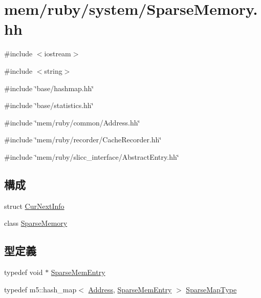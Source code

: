 \hypertarget{SparseMemory_8hh}{
\section{mem/ruby/system/SparseMemory.hh}
\label{SparseMemory_8hh}
}
{\ttfamily \#include $<$iostream$>$}\par
{\ttfamily \#include $<$string$>$}\par
{\ttfamily \#include \char`\"{}base/hashmap.hh\char`\"{}}\par
{\ttfamily \#include \char`\"{}base/statistics.hh\char`\"{}}\par
{\ttfamily \#include \char`\"{}mem/ruby/common/Address.hh\char`\"{}}\par
{\ttfamily \#include \char`\"{}mem/ruby/recorder/CacheRecorder.hh\char`\"{}}\par
{\ttfamily \#include \char`\"{}mem/ruby/slicc\_\-interface/AbstractEntry.hh\char`\"{}}\par
\subsection*{構成}
\begin{DoxyCompactItemize}
\item 
struct \hyperlink{structCurNextInfo}{CurNextInfo}
\item 
class \hyperlink{classSparseMemory}{SparseMemory}
\end{DoxyCompactItemize}
\subsection*{型定義}
\begin{DoxyCompactItemize}
\item 
typedef void $\ast$ \hyperlink{SparseMemory_8hh_a5d79201ca807d6e5b23968dba80949e3}{SparseMemEntry}
\item 
typedef m5::hash\_\-map$<$ \hyperlink{classAddress}{Address}, \hyperlink{SparseMemory_8hh_a5d79201ca807d6e5b23968dba80949e3}{SparseMemEntry} $>$ \hyperlink{SparseMemory_8hh_a93e9b04c329a9452d20206c8e31a4172}{SparseMapType}
\end{DoxyCompactItemize}


